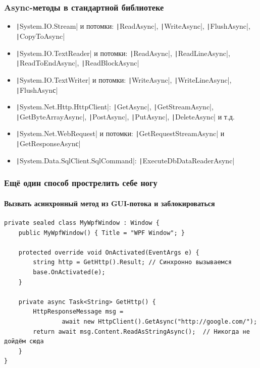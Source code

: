 \documentclass[xetex,mathserif,serif]{beamer}
\begin{document}
	\begin{frame}
		\frametitle{Async-методы в стандартной библиотеке}
		\begin{itemize}
			\item \texttt|System.IO.Stream| и потомки: \texttt|ReadAsync|, \texttt|WriteAsync|, \texttt|FlushAsync|, \texttt|CopyToAsync|
			\item \texttt|System.IO.TextReader| и потомки: \texttt|ReadAsync|, \texttt|ReadLineAsync|, \texttt|ReadToEndAsync|, \texttt|ReadBlockAsync|
			\item \texttt|System.IO.TextWriter| и потомки: \texttt|WriteAsync|, \texttt|WriteLineAsync|, \texttt|FlushAsynс|
			\item \texttt|System.Net.Http.HttpClient|: \texttt|GetAsync|, \texttt|GetStreamAsync|, \texttt|GetByteArrayAsync|, \texttt|PostAsync|, \texttt|PutAsync|, \texttt|DeleteAsync| и т.д.
			\item \texttt|System.Net.WebRequest| и потомки: \texttt|GetRequestStreamAsync| и \texttt|GetResponseAsynс|
			\item \texttt|System.Data.SqlClient.SqlCommand|: \texttt|ExecuteDbDataReaderAsync|
		\end{itemize}
	\end{frame}

	\begin{frame}[fragile]
		\frametitle{Ещё один способ прострелить себе ногу}
		\framesubtitle{Вызвать асинхронный метод из GUI-потока и заблокироваться}
		\begin{footnotesize}
			\begin{verbatim}
private sealed class MyWpfWindow : Window {
    public MyWpfWindow() { Title = "WPF Window"; }

    protected override void OnActivated(EventArgs e) {
        string http = GetHttp().Result; // Синхронно вызываемся
        base.OnActivated(e);
    }

    private async Task<String> GetHttp() {
        HttpResponseMessage msg = 
                await new HttpClient().GetAsync("http://google.com/");
        return await msg.Content.ReadAsStringAsync();  // Никогда не дойдём сюда
    }
}
			\end{verbatim}
		\end{footnotesize}
	\end{frame}
\end{document}
